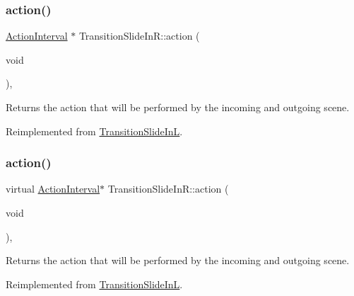 \subsubsection{\texorpdfstring{action()}{action()}\hspace{0.1cm}{\footnotesize\ttfamily [1/2]}}
{\footnotesize\ttfamily \hyperlink{classActionInterval}{Action\+Interval} $\ast$ Transition\+Slide\+In\+R\+::action (\begin{DoxyParamCaption}\item[{void}]{ }\end{DoxyParamCaption})\hspace{0.3cm}{\ttfamily [override]}, {\ttfamily [virtual]}}

Returns the action that will be performed by the incoming and outgoing scene. 

Reimplemented from \hyperlink{classTransitionSlideInL_a22b0c0b07f15fc0d19fcdf01e4182a3e}{Transition\+Slide\+InL}.

\mbox{\label{classTransitionSlideInR_a8b573f57d622f77739e36a03e9b80d3a}} 
\subsubsection{\texorpdfstring{action()}{action()}\hspace{0.1cm}{\footnotesize\ttfamily [2/2]}}
{\footnotesize\ttfamily virtual \hyperlink{classActionInterval}{Action\+Interval}$\ast$ Transition\+Slide\+In\+R\+::action (\begin{DoxyParamCaption}\item[{void}]{ }\end{DoxyParamCaption})\hspace{0.3cm}{\ttfamily [override]}, {\ttfamily [virtual]}}

Returns the action that will be performed by the incoming and outgoing scene. 

Reimplemented from \hyperlink{classTransitionSlideInL_a22b0c0b07f15fc0d19fcdf01e4182a3e}{Transition\+Slide\+InL}.

\mbox{\label{classTransitionSlideInR_aedc1e8cbe31e4f4cb97c23efa4c88770}} 
